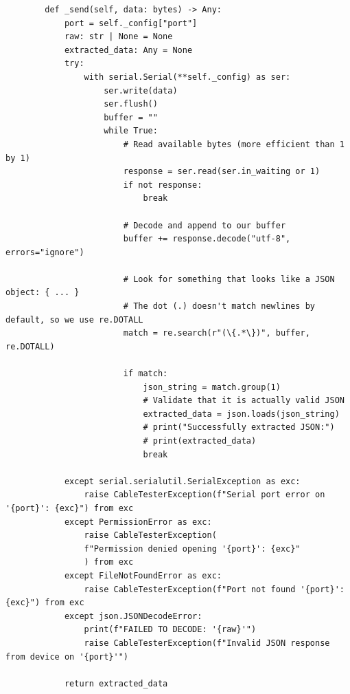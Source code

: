 \begin{listing}[H]
    \begin{verbatim}
        def _send(self, data: bytes) -> Any:
            port = self._config["port"]
            raw: str | None = None
            extracted_data: Any = None
            try:
                with serial.Serial(**self._config) as ser:
                    ser.write(data)
                    ser.flush()
                    buffer = ""
                    while True:
                        # Read available bytes (more efficient than 1 by 1)
                        response = ser.read(ser.in_waiting or 1)
                        if not response:
                            break
                    
                        # Decode and append to our buffer
                        buffer += response.decode("utf-8", errors="ignore")
                        
                        # Look for something that looks like a JSON object: { ... }
                        # The dot (.) doesn't match newlines by default, so we use re.DOTALL
                        match = re.search(r"(\{.*\})", buffer, re.DOTALL)
                        
                        if match:
                            json_string = match.group(1)
                            # Validate that it is actually valid JSON
                            extracted_data = json.loads(json_string)
                            # print("Successfully extracted JSON:")
                            # print(extracted_data)
                            break
            
            except serial.serialutil.SerialException as exc:
                raise CableTesterException(f"Serial port error on '{port}': {exc}") from exc
            except PermissionError as exc:
                raise CableTesterException(
                f"Permission denied opening '{port}': {exc}"
                ) from exc
            except FileNotFoundError as exc:
                raise CableTesterException(f"Port not found '{port}': {exc}") from exc
            except json.JSONDecodeError:
                print(f"FAILED TO DECODE: '{raw}'")
                raise CableTesterException(f"Invalid JSON response from device on '{port}'")
            
            return extracted_data
    \end{verbatim}
    \caption[Ctclient \_send]{Code van de interne send methode.}
    \label{cf:_send}
\end{listing}

